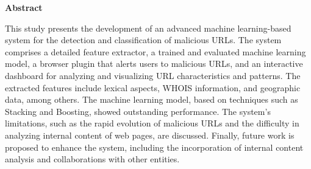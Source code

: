 \documentclass[12pt,a4paper]{article}
\begin{document}
\medskip

\textbf{Abstract}

This study presents the development of an advanced machine learning-based system for the detection and classification of malicious URLs. The system comprises a detailed feature extractor, a trained and evaluated machine learning model, a browser plugin that alerts users to malicious URLs, and an interactive dashboard for analyzing and visualizing URL characteristics and patterns. The extracted features include lexical aspects, WHOIS information, and geographic data, among others. The machine learning model, based on techniques such as Stacking and Boosting, showed outstanding performance. The system's limitations, such as the rapid evolution of malicious URLs and the difficulty in analyzing internal content of web pages, are discussed. Finally, future work is proposed to enhance the system, including the incorporation of internal content analysis and collaborations with other entities.



\newpage
\pagestyle{fancy}



\tableofcontents                                                         %
\newpage                                                                 %
\listoffigures                                                           %
\newpage                                                                 %
\listoftables                                                            %
\newpage                                                                 %
\end{document}
